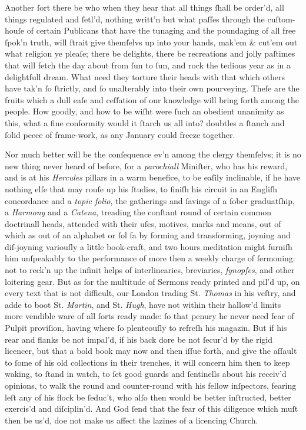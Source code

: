 Another ſort there be who when they hear that all things ſhall be order'd, all
things regulated and ſetl'd, nothing writt'n but what paſſes through the
cuſtom-houſe of certain Publicans that have the tunaging and the poundaging of
all free ſpok'n truth, will ſtrait give themſelvs up into your hands, mak'em \&
cut'em out what religion ye pleaſe; there be delights, there be recreations and
jolly paſtimes that will fetch the day about from ſun to ſun, and rock the
tedious year as in a delightfull dream.  What need they torture their heads with
that which others have tak'n ſo ſtrictly, and ſo unalterably into their own
pourveying.  Theſe are the fruits which a dull eaſe and ceſſation of our
knowledge will bring forth among the people.  How goodly, and how to be wiſht
were ſuch an obedient unanimity as this, what a fine conformity would it ſtarch
us all into? doubtles a ſtanch and ſolid peece of frame-work, as any January
could freeze together.

Nor much better will be the conſequence ev'n among the clergy themſelvs; it is
no new thing never heard of before, for a \textit{parochiall} Miniſter, who has
his reward, and is at his \textit{Hercules} pillars in a warm benefice, to be
eaſily inclinable, if he have nothing elſe that may rouſe up his ſtudies, to
finiſh his circuit in an Engliſh concordance and a \textit{topic folio}, the
gatherings and ſavings of a ſober graduatſhip, a \textit{Harmony} and a
\textit{Catena}, treading the conſtant round of certain common doctrinall heads,
attended with their uſes, motives, marks and means, out of which as out of an
alphabet or ſol fa by forming and transforming, joyning and diſ-joyning
variouſly a little book-craft, and two hours meditation might furniſh him
unſpeakably to the performance of more then a weekly charge of ſermoning: not to
reck'n up the infinit helps of interlinearies, breviaries, \textit{ſynopſes},
and other loitering gear.  But as for the multitude of Sermons ready printed and
pil'd up, on every text that is not difficult, our London trading St.
\textit{Thomas} in his veſtry, and adde to boot St. \textit{Martin}, and St.
\textit{Hugh}, have not within their hallow'd limits more vendible ware of all
ſorts ready made: ſo that penury he never need fear of Pulpit proviſion, having
where ſo plenteouſly to refreſh his magazin.  But if his rear and flanks be not
impal'd, if his back dore be not ſecur'd by the rigid licencer, but that a bold
book may now and then iſſue forth, and give the aſſault to ſome of his old
collections in their trenches, it will concern him then to keep waking, to ſtand
in watch, to ſet good guards and ſentinells about his receiv'd opinions, to walk
the round and counter-round with his fellow inſpectors, fearing leſt any of his
flock be ſeduc't, who alſo then would be better inſtructed, better exercis'd and
diſciplin'd.  And God ſend that the fear of this diligence which muſt then be
us'd, doe not make us affect the lazines of a licencing Church.

